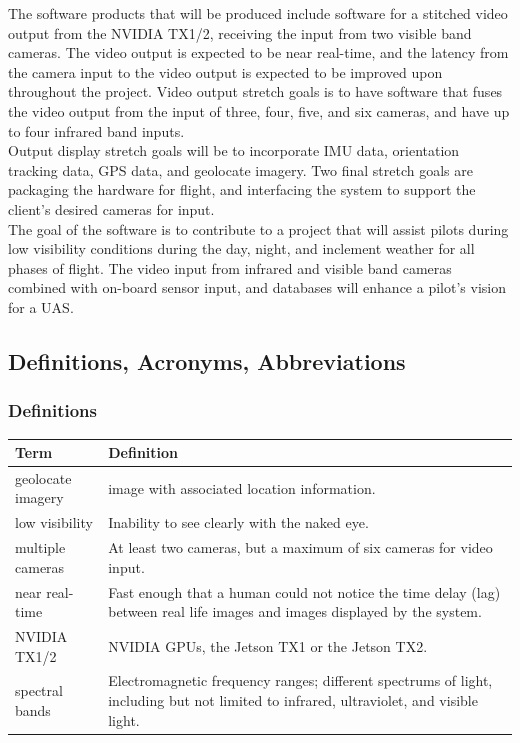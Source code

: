 \documentclass[letterpaper,10pt,serif,draftclsnofoot,onecolumn,compsoc,titlepage]{IEEEtran}
\begin{document}
The software products that will be produced include software for a stitched video output 
from the NVIDIA TX1/2, receiving the input from two visible band cameras. 
The video output is expected to be near real-time, and the latency from the camera 
input to the video output is expected to be improved upon throughout the project. Video 
output stretch goals is to have software that fuses the video output from the input of 
three, four, five, and six cameras, and have up to four infrared band inputs.\\

Output display stretch goals will be to incorporate IMU data, orientation tracking 
data, GPS data, and geolocate imagery. Two final stretch goals are packaging the 
hardware for flight, and interfacing the system to support the client's desired 
cameras for input.\\

The goal of the software is to contribute to a project that will assist pilots during 
low visibility conditions during the day, night, and inclement weather for all phases 
of flight. The video input from infrared and visible band cameras combined with 
on-board sensor input, and databases will enhance a pilot's vision for a UAS.\\

\subsection{Definitions, Acronyms, Abbreviations}

\subsubsection{Definitions}

\begin{tabular}{|l|p{11cm}|}
	\hline
	\textbf{Term} & \textbf{Definition}\\
	\hline
	geolocate imagery & image with associated location information.\\
	\hline
	low visibility & Inability to see clearly with the naked eye.\\
	\hline	
	multiple cameras & At least two cameras, but a maximum of six cameras for 
	video input.\\
	\hline
	near real-time & Fast enough that a human could not notice the time 
	delay (lag) between \newline real life images and images displayed by the system.\\
	\hline
	NVIDIA TX1/2 & NVIDIA GPUs, the Jetson TX1 or the Jetson TX2.\\
	\hline
	spectral bands & Electromagnetic frequency ranges; different 
	spectrums of light, including \newline but not limited to infrared, ultraviolet, 
	and visible light.\\
	\hline
\end{tabular}
\end{document}
